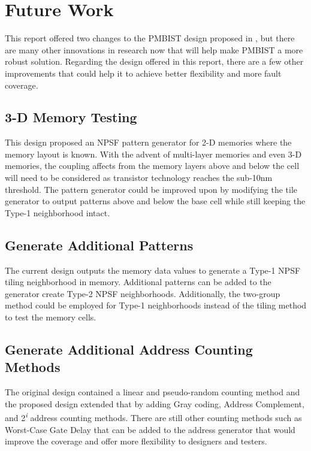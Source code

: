 \section{Future Work}
\label{sect:bg-future}
This report offered two changes to the PMBIST design proposed in \cite{1584083}, but there are many other innovations in research now that will help make PMBIST a more robust solution.  Regarding the design offered in this report, there are a few other improvements that could help it to achieve better flexibility and more fault coverage.

\subsection{3-D Memory Testing}
This design proposed an NPSF pattern generator for 2-D memories where the memory layout is known.  With the advent of multi-layer memories and even 3-D memories, the coupling affects from the memory layers above and below the cell will need to be considered as transistor technology reaches the sub-10nm threshold.  The pattern generator could be improved upon by modifying the tile generator to output patterns above and below the base cell while still keeping the Type-1 neighborhood intact.

\subsection{Generate Additional Patterns}
The current design outputs the memory data values to generate a Type-1 NPSF tiling neighborhood in memory.  Additional patterns can be added to the generator create Type-2 NPSF neighborhoods.  Additionally, the two-group method could be employed for Type-1 neighborhoods instead of the tiling method to test the memory cells.

\subsection{Generate Additional Address Counting Methods}
The original design contained a linear and pseudo-random counting method and the proposed design extended that by adding Gray coding, Address Complement, and 2\textsuperscript{\textit{i}} address counting methods.  There are still other counting methods such as Worst-Case Gate Delay that can be added to the address generator that would improve the coverage and offer more flexibility to designers and testers.  
